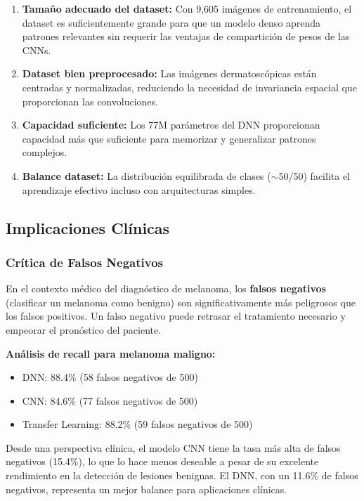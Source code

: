 \documentclass[11pt, a4paper]{article}
\begin{document}
\begin{enumerate}
    \item \textbf{Tamaño adecuado del dataset:} Con 9,605 imágenes de entrenamiento, el dataset es suficientemente grande para que un modelo denso aprenda patrones relevantes sin requerir las ventajas de compartición de pesos de las CNNs.
    
    \item \textbf{Dataset bien preprocesado:} Las imágenes dermatoscópicas están centradas y normalizadas, reduciendo la necesidad de invariancia espacial que proporcionan las convoluciones.
    
    \item \textbf{Capacidad suficiente:} Los 77M parámetros del DNN proporcionan capacidad más que suficiente para memorizar y generalizar patrones complejos.
    
    \item \textbf{Balance dataset:} La distribución equilibrada de clases ($\sim$50/50) facilita el aprendizaje efectivo incluso con arquitecturas simples.
\end{enumerate}

\subsection{Implicaciones Clínicas}

\subsubsection{Crítica de Falsos Negativos}

En el contexto médico del diagnóstico de melanoma, los \textbf{falsos negativos} (clasificar un melanoma como benigno) son significativamente más peligrosos que los falsos positivos. Un falso negativo puede retrasar el tratamiento necesario y empeorar el pronóstico del paciente.

\textbf{Análisis de recall para melanoma maligno:}
\begin{itemize}
    \item DNN: 88.4\% (58 falsos negativos de 500)
    \item CNN: 84.6\% (77 falsos negativos de 500)
    \item Transfer Learning: 88.2\% (59 falsos negativos de 500)
\end{itemize}

Desde una perspectiva clínica, el modelo CNN tiene la tasa más alta de falsos negativos (15.4\%), lo que lo hace menos deseable a pesar de su excelente rendimiento en la detección de lesiones benignas. El DNN, con un 11.6\% de falsos negativos, representa un mejor balance para aplicaciones clínicas.
\end{document}
